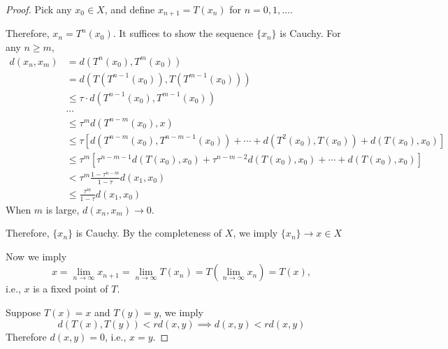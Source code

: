 \begin{proof}
Pick any $x_0\in X$, and define $x_{n+1}=T(x_n)$ for $n=0,1,\dots$.

Therefore, $x_n=T^n(x_0)$. It suffices to show the sequence $\{x_n\}$ is Cauchy. For any $n\ge m$,
\begin{align*}
d(x_n,x_m)&=d(T^n(x_0),T^m(x_0))\\
&=d(T(T^{n-1}(x_0)),T(T^{m-1}(x_0)))\\
&\le \tau\cdot d(T^{n-1}(x_0),T^{m-1}(x_0))\\
&\cdots\\
&\le \tau^md(T^{n-m}(x_0),x)\\
&\le\tau[d(T^{n-m}(x_0),T^{n-m-1}(x_0))+\cdots+d(T^2(x_0),T(x_0))+d(T(x_0),x_0)]\\
&\le\tau^m
\left[
\tau^{n-m-1}d(T(x_0),x_0)
+
\tau^{n-m-2}d(T(x_0),x_0)
+
\cdots+
d(T(x_0),x_0)
\right]\\
&<\tau^m
\frac{1-\tau^{n-m}}{1-\tau}d(x_1,x_0)\\
&\le\frac{\tau^m}{1-\tau}d(x_1,x_0)
\end{align*}
When $m$ is large, $d(x_n,x_m)\to0$.

Therefore, $\{x_n\}$ is Cauchy. By the completeness of $X$, we imply $\{x_n\}\to x\in X$

Now we imply
\[
x=\lim_{n\to\infty}x_{n+1}=\lim_{n\to\infty}T(x_n)=T(\lim_{n\to\infty}x_n)=T(x),
\]
i.e., $x$ is a fixed point of $T$.

Suppose $T(x)=x$ and $T(y)=y$, we imply
\[
d(T(x),T(y))<rd(x,y)\implies d(x,y)<rd(x,y)
\]
Therefore $d(x,y)=0$, i.e., $x=y$.

\end{proof}

